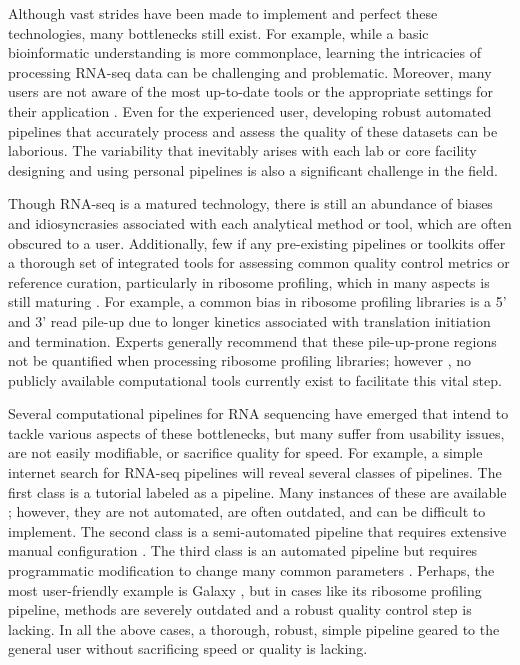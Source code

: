 \documentclass[11pt, a4paper, oneside]{article}
\begin{document}
Although vast strides have been made to implement and perfect these technologies, many bottlenecks still exist. For example, while a basic bioinformatic understanding is more commonplace, learning the intricacies of processing RNA-seq data can be challenging and problematic. Moreover, many users are not aware of the most up-to-date tools or the appropriate settings for their application \cite{costello_npjsba, funari_science}. Even for the experienced user, developing robust automated pipelines that accurately process and assess the quality of these datasets can be laborious. The variability that inevitably arises with each lab or core facility designing and using personal pipelines is also a significant challenge in the field. \par

Though RNA-seq is a matured technology, there is still an abundance of biases and idiosyncrasies associated with each analytical method or tool, which are often obscured to a user. Additionally, few if any pre-existing pipelines or toolkits offer a thorough set of integrated tools for assessing common quality control metrics or reference curation, particularly in ribosome profiling, which in many aspects is still maturing \cite{ingolia_meth}. For example, a common bias in ribosome profiling libraries is a 5' and 3' read pile-up \cite{gerashchenko_nar, artieri_gr, hussman_plosg} due to longer kinetics associated with translation initiation and termination. Experts generally recommend that these pile-up-prone regions not be quantified when processing ribosome profiling libraries; however \cite{ingolia_meth, weinberg_reports}, no publicly available computational tools currently exist to facilitate this vital step. \par

Several computational pipelines for RNA sequencing have emerged that intend to tackle various aspects of these bottlenecks, but many suffer from usability issues, are not easily modifiable, or sacrifice quality for speed. For example, a simple internet search for RNA-seq pipelines will reveal several classes of pipelines. The first class is a tutorial labeled as a pipeline. Many instances of these are available \cite{encode_pipeline, gdc_pipeline}; however, they are not automated, are often outdated, and can be difficult to implement. The second class is a semi-automated pipeline that requires extensive manual configuration \cite{pavlidis_pipeline, nfcore_pipeline, umcu_pipeline, cellgeni_pipeline}. The third class is an automated pipeline but requires programmatic modification to change many common parameters \cite{dnanexus_pipeline, nextflow_pipeline}. Perhaps, the most user-friendly example is Galaxy \cite{galaxy}, but in cases like its ribosome profiling pipeline, methods are severely outdated and a robust quality control step is lacking. In all the above cases, a thorough, robust, simple pipeline geared to the general user without sacrificing speed or quality is lacking. \par
\end{document}
